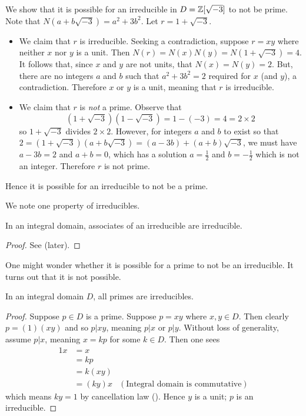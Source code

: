 \begin{example}
    We show that it is possible for an irreducible in $D = \mathbb{Z}[\sqrt{-3}]$ to not be prime. Note that $N(a+b\sqrt{-3}) = a^2 + 3b^2$. Let $r = 1 + \sqrt{-3}$.
    \begin{itemize}
        \item We claim that $r$ is irreducible. Seeking a contradiction, suppose $r = xy$ where neither $x$ nor $y$ is a unit. Then $N(r) = N(x)N(y) = N(1+\sqrt{-3}) = 4$. It follows that, since $x$ and $y$ are not units, that $N(x) = N(y) = 2$. But, there are no integers $a$ and $b$ such that $a^2 + 3b^2 = 2$ required for $x$ (and $y$), a contradiction. Therefore $x$ or $y$ is a unit, meaning that $r$ is irreducible.

        \item We claim that $r$ is \textit{not} a prime. Observe that
        \[
            (1+\sqrt{-3})(1-\sqrt{-3}) = 1-(-3) = 4 = 2 \times 2
        \]
        so $1 + \sqrt{-3}$ divides $2 \times 2$. However, for integers $a$ and $b$ to exist so that $2 = (1+\sqrt{-3})(a+b\sqrt{-3}) = (a-3b) + (a+b)\sqrt{-3}$, we must have $a - 3b = 2$ and $a + b = 0$, which has a solution $a = \frac12$ and $b = -\frac12$ which is not an integer. Therefore $r$ is not prime.
    \end{itemize}
    Hence it is possible for an irreducible to not be a prime.
\end{example}

We note one property of irreducibles.
\begin{proposition}\label{prop-associates-of-irreducible-is-irreducible}
    In an integral domain, associates of an irreducible are irreducible.
\end{proposition}
\begin{proof}
    See  (later).
\end{proof}

One might wonder whether it is possible for a prime to not be an irreducible. It turns out that it is not possible.
\begin{theorem}\label{thrm-in-integral-domain-primes-are-irreducibles}
    In an integral domain $D$, all primes are irreducibles.
\end{theorem}
\begin{proof}
    Suppose $p \in D$ is a prime. Suppose $p = xy$ where $x, y\in D$. Then clearly $p = (1)(xy)$ and so $p \vert xy$, meaning $p \vert x$ or $p \vert y$. Without loss of generality, assume $p \vert x$, meaning $x = kp$ for some $k \in D$. Then one sees
    \begin{align*}
        1x &= x\\
        &= kp\\
        &= k(xy)\\
        &= (ky)x & (\text{Integral domain is commutative})
    \end{align*}
    which means $ky = 1$ by cancellation law (). Hence $y$ is a unit; $p$ is an irreducible.
\end{proof}

